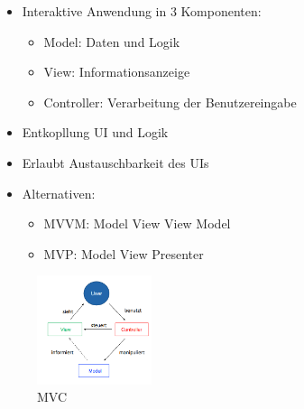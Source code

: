 \documentclass{article}
\begin{document}
\begin{multicols}{2}
	\begin{itemize}
		\item Interaktive Anwendung in 3 Komponenten:
		\begin{itemize}
			\item \colorbox{violet!40} {Model:} Daten und Logik
			\item \colorbox{violet!40} {View:} Informationsanzeige
			\item \colorbox{violet!40} {Controller:} Verarbeitung der Benutzereingabe
		\end{itemize}
		\item Entkopllung UI und Logik
		\item Erlaubt Austauschbarkeit des UIs
		\item Alternativen:
		\begin{itemize}
			\item MVVM: Model View View Model
			\item MVP: Model View Presenter
		\end{itemize}
	\end{itemize}
\columnbreak

\begin{figure}[H]			\includegraphics[width=0.3\textwidth] {Resources/Images/MVC.png}
\caption{\label{fig:MVC}MVC}
\end{figure}

\end{multicols}
\end{document}
